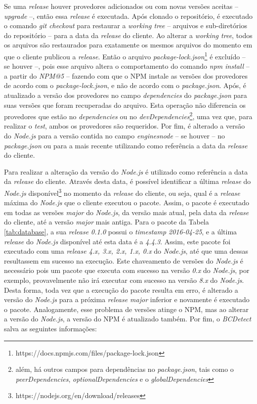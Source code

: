 Se uma \textit{release} houver provedores adicionados ou com novas versões aceitas -- \textit{upgrade} --, então essa \textit{release} é executada. Após clonado o repositório, é executado o comando \textit{git checkout} para restaurar a \textit{working tree} -- arquivos e sub-diretórios do repositório -- para a data da \textit{release} do cliente. Ao alterar a \textit{working tree}, todos os arquivos são restaurados para exatamente os mesmos arquivos do momento em que o cliente publicou a \textit{release}. Então o arquivo \textit{package-lock.json}\footnote{https://docs.npmjs.com/files/package-lock.json} é excluído -- se houver --, pois esse arquivo altera o comportamento do comando \textit{npm install} -- a partir do \textit{NPM@5} -- fazendo com que o \gls{NPM} instale as versões dos provedores de acordo com o \textit{package-lock.json}, e não de acordo com o \textit{package.json}. Após, é atualizado a versão dos provedores no campo \textit{dependencies} do \textit{package.json} para suas versões que foram recuperadas do arquivo. Esta operação não diferencia os provedores que estão no \textit{dependencies} ou no \textit{devDependencies}\footnote{além, há outros campos para dependências no \textit{package.json}, tais como o \textit{peerDependencies}, \textit{optionalDependencies} e o \textit{globalDependencies}}, uma vez que, para realizar o \textit{test}, ambos os provedores são requeridos. Por fim, é alterado a versão do \textit{Node.js} para a versão contida no campo \textit{engines\textrightarrow node} -- se houver -- no \textit{package.json} ou para a mais recente utilizando como referência a data da \textit{release} do cliente.

Para realizar a alteração da versão do \textit{Node.js} é utilizado como referência a data da \textit{release} do cliente. Através desta data, é possível identificar a última \textit{release} do \textit{Node.js} disponível\footnote{https://nodejs.org/en/download/releases} no momento da \textit{release} do cliente, ou seja, qual é a \textit{release} máxima do \textit{Node.js} que o cliente executou o pacote. Assim, o pacote é executado em todas as versões \textit{major} do \textit{Node.js}, da versão mais atual, pela data da \textit{release} do cliente, até a versão \textit{major} mais antiga. Para o pacote da Tabela \ref{tab:database}, a sua \textit{release 0.1.0} possui o \textit{timestamp 2016-04-25}, e a última \textit{release} do \textit{Node.js} disponível até esta data é a \textit{4.4.3}. Assim, este pacote foi executado com uma \textit{release 4.x, 3.x, 2.x, 1.x, 0.x} do \textit{Node.js}, até que uma dessas resultassem em sucesso na execução. Este chaveamento de versões do \textit{Node.js} é necessário pois um pacote que executa com sucesso na versão \textit{0.x} do \textit{Node.js}, por exemplo, provavelmente não irá executar com sucesso na versão \textit{8.x} do \textit{Node.js}. Desta forma, toda vez que a execução do pacote resulta em erro, é alterado a versão do \textit{Node.js} para a próxima \textit{release major} inferior e novamente é executado o pacote. Analogamente, esse problema de versões atinge o \gls{NPM}, mas ao alterar a versão do \textit{Node.js}, a versão do \gls{NPM} é atualizado também. Por fim, o \textit{BCDetect} salva as seguintes informações:

